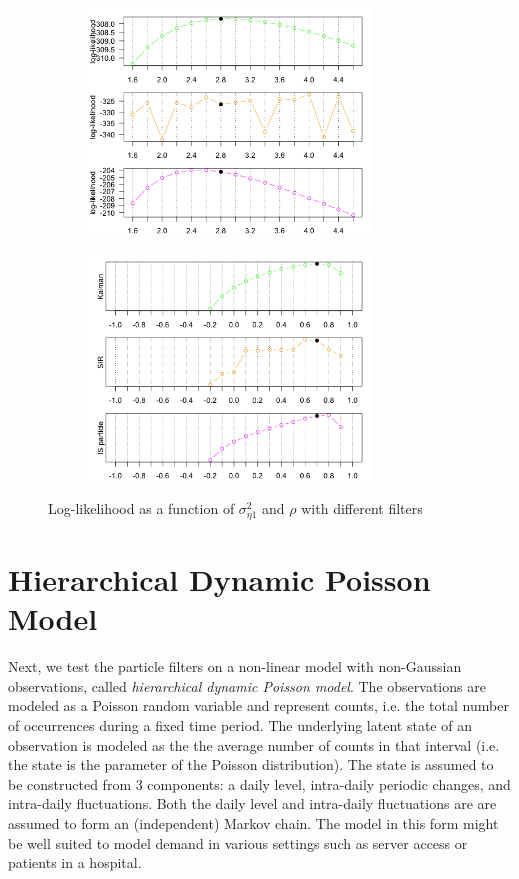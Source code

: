 \documentclass[11pt, oneside]{scrreprt}   	%
\begin{document}
\begin{figure}[h!]
\centering
\begin{subfigure}{.5\textwidth}
  \centering
  \includegraphics[width=75mm]{../../images/mllm-loglik-var2.png}
\end{subfigure}%
\begin{subfigure}{.5\textwidth}
  \centering
  \includegraphics[width=75mm]{../../images/mllm-loglik-rho.png}
\end{subfigure}
\caption{Log-likelihood as a function of $\sigma_{\eta 1}^2$ and $\rho$ with different filters}
\label{fig:mllm_loglik}
\end{figure}


\newpage
\section{Hierarchical Dynamic Poisson Model}
Next, we test the particle filters on a non-linear model with non-Gaussian observations, called \textit{hierarchical dynamic Poisson model}. The observations are modeled as a Poisson random variable and represent counts, i.e. the total number of occurrences during a fixed time period. The underlying latent state of an observation is modeled as the the average number of counts in that interval (i.e. the state is the parameter of the Poisson distribution). The state is assumed to be constructed from 3 components: a daily level, intra-daily periodic changes, and intra-daily fluctuations. Both the daily level and intra-daily fluctuations are are assumed to form an (independent) Markov chain. The model in this form might be well suited to model demand in various settings such as server access or patients in a hospital.
\end{document}
